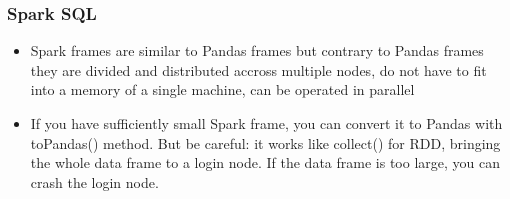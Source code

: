 \documentclass{beamer}
\begin{document}
\begin{frame}[fragile]
  \frametitle{Spark SQL}
  
  \begin{itemize}
  \item Spark frames are similar to Pandas frames but contrary to Pandas frames they are divided and
    distributed accross multiple nodes, do not have to fit into a memory of a single machine, can be operated in parallel
  \item If you have sufficiently small Spark frame, you can convert it to Pandas with {\color{mycolorcode}toPandas()} method.
    But be careful: it works like {\color{mycolorcode}collect()} for RDD, bringing the whole data frame to a login node. If the data frame
    is too large, you can crash the login node.
  \end{itemize}
  \end{frame}
\end{document}
